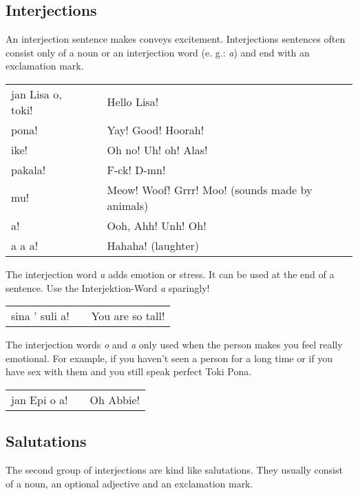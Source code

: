 \subsection*{Interjections}
%
An interjection sentence makes conveys excitement.
Interjections sentences often consist only of a noun or an interjection word (e. g.: \textit{a}) and end with an exclamation mark.

\begin{supertabular}{p{5,5cm}|ll}
jan Lisa o, toki! && Hello Lisa! \\
pona! && Yay! Good! Hoorah! \\
ike! && Oh no! Uh! oh! Alas! \\
pakala! && F-ck! D-mn! \\
mu! && Meow! Woof! Grrr! Moo! (sounds made by animals) \\
a! && Ooh, Ahh! Unh! Oh! \\
a a a! && Hahaha! (laughter) \\
\end{supertabular} 

The interjection word \textit{a} adds emotion or stress. 
It can be used at the end of a sentence.
Use the Interjektion-Word \textit{a} sparingly!

\begin{supertabular}{p{5,5cm}|ll}
sina ' suli a! && You are so tall! \\
\end{supertabular} 

The interjection words \textit{o} and \textit{a} only used when the person makes you feel really emotional. 
For example, if you haven't seen a person for a long time or if you have sex with them and you still speak perfect Toki Pona. 

\begin{supertabular}{p{5,5cm}|ll}
jan Epi o a! && Oh Abbie! \\
\end{supertabular} 

\subsection*{Salutations}
%
The second group of interjections are kind like salutations.
They usually consist of a noun, an optional adjective and an exclamation mark. 

